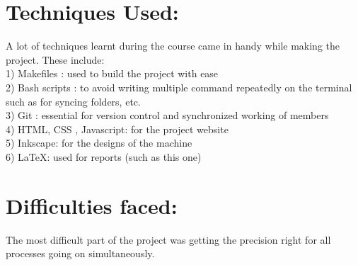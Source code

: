 \documentclass{article}
\begin{document}
\section*{Techniques Used:}
A lot of techniques learnt during the course came in handy while making the project. These include:\\
1) Makefiles : used to build the project with ease\\
2) Bash scripts : to avoid writing multiple command repeatedly on the terminal such as for syncing folders, etc.\\
3) Git : essential for version control and synchronized working of members\\
4) HTML, CSS , Javascript: for the project website\\
5) Inkscape: for the designs of the machine\\
6) \LaTeX : used for reports (such as this one)\\





\section*{Difficulties faced:}
The most difficult part of the project was getting the precision right for all processes going on simultaneously. 
\end{document}
